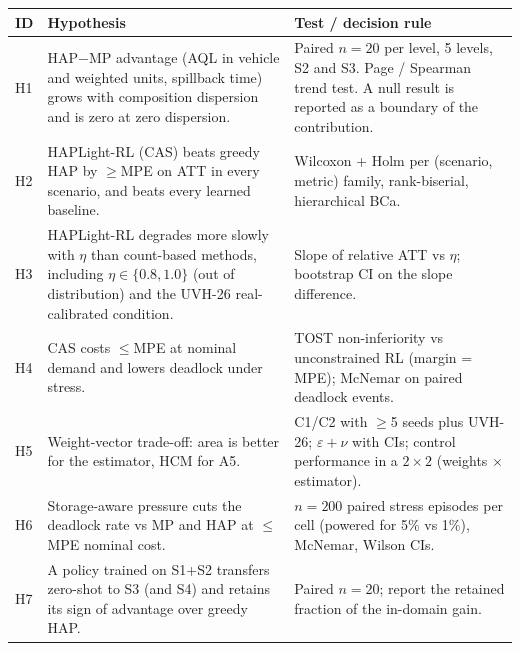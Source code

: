 \documentclass[11pt,a4paper]{article}
\begin{document}
\small
\begin{longtable}{@{}p{0.9cm}p{6.7cm}p{8.2cm}@{}}
\toprule
ID & Hypothesis & Test / decision rule \\
\midrule
\endhead
H1 & HAP$-$MP advantage (AQL in vehicle and weighted units, spillback time) grows with
     composition dispersion and is zero at zero dispersion. &
     Paired $n=20$ per level, 5 levels, S2 and S3. Page / Spearman trend test. A null result
     is reported as a boundary of the contribution. \\
H2 & HAPLight-RL (CAS) beats greedy HAP by $\ge$MPE on ATT in every scenario, and beats
     every learned baseline. &
     Wilcoxon + Holm per (scenario, metric) family, rank-biserial, hierarchical BCa. \\
H3 & HAPLight-RL degrades more slowly with $\eta$ than count-based methods, including
     $\eta\in\{0.8,1.0\}$ (out of distribution) and the UVH-26 real-calibrated condition. &
     Slope of relative ATT vs $\eta$; bootstrap CI on the slope difference. \\
H4 & CAS costs $\le$MPE at nominal demand and lowers deadlock under stress. &
     TOST non-inferiority vs unconstrained RL (margin = MPE); McNemar on paired deadlock
     events. \\
H5 & Weight-vector trade-off: area is better for the estimator, HCM for A5. &
     C1/C2 with $\ge$5 seeds plus UVH-26; $\varepsilon+\nu$ with CIs; control performance in
     a $2\times2$ (weights $\times$ estimator). \\
H6 & Storage-aware pressure cuts the deadlock rate vs MP and HAP at $\le$MPE nominal cost. &
     $n=200$ paired stress episodes per cell (powered for 5\% vs 1\%), McNemar, Wilson CIs. \\
H7 & A policy trained on S1+S2 transfers zero-shot to S3 (and S4) and retains its sign of
     advantage over greedy HAP. &
     Paired $n=20$; report the retained fraction of the in-domain gain. \\
\bottomrule
\end{longtable}
\normalsize
\end{document}
